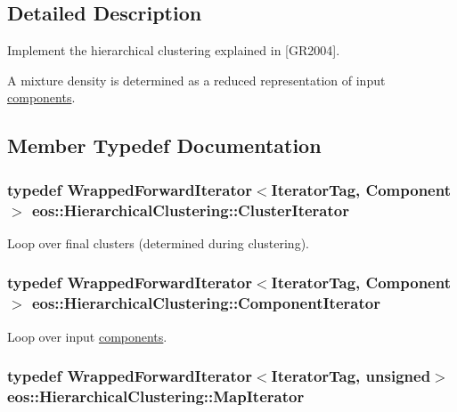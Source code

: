 \subsection{Detailed Description}
Implement the hierarchical clustering explained in \mbox{[}GR2004\mbox{]}.

A mixture density is determined as a reduced representation of input \hyperlink{namespaceeos_1_1components}{components}. 

\subsection{Member Typedef Documentation}
\hypertarget{classeos_1_1HierarchicalClustering_aae7753bcc3666ca15b333a39aa454b29}{
\subsubsection[{ClusterIterator}]{\setlength{\rightskip}{0pt plus 5cm}typedef {\bf WrappedForwardIterator}$<$IteratorTag, {\bf Component}$>$ {\bf eos::HierarchicalClustering::ClusterIterator}}}
\label{classeos_1_1HierarchicalClustering_aae7753bcc3666ca15b333a39aa454b29}


Loop over final clusters (determined during clustering). \hypertarget{classeos_1_1HierarchicalClustering_a4d4c7214856d750b968299925f29b207}{
\subsubsection[{ComponentIterator}]{\setlength{\rightskip}{0pt plus 5cm}typedef {\bf WrappedForwardIterator}$<$IteratorTag, {\bf Component}$>$ {\bf eos::HierarchicalClustering::ComponentIterator}}}
\label{classeos_1_1HierarchicalClustering_a4d4c7214856d750b968299925f29b207}


Loop over input \hyperlink{namespaceeos_1_1components}{components}. \hypertarget{classeos_1_1HierarchicalClustering_a7cf007a3d8e09d9b37f0c28c82013441}{
\subsubsection[{MapIterator}]{\setlength{\rightskip}{0pt plus 5cm}typedef {\bf WrappedForwardIterator}$<$IteratorTag, unsigned$>$ {\bf eos::HierarchicalClustering::MapIterator}}}
\label{classeos_1_1HierarchicalClustering_a7cf007a3d8e09d9b37f0c28c82013441}


